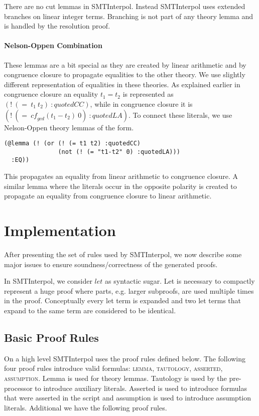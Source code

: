 \documentclass[a4paper]{article}
\newcommand\si{SMTInterpol\xspace}
\newcommand\cf{\mathit{cf}}
\begin{document}
There are no cut lemmas in \si.  Instead \si uses extended branches on
linear integer terms.  Branching is not part of any theory lemma and
is handled by the resolution proof.

\paragraph{Nelson-Oppen Combination}

These lemmas are a bit special as they are created by linear
arithmetic and by congruence closure to propagate equalities to the
other theory.  We use slightly different representation of equalities
in these theories.  As explained earlier in congruence closure an
equality $t_1=t_2$ is represented as $(!\ (=\ t_1\ t_2)\ :quotedCC)$,
while in congruence closure it is
$(!\ (=\ \cf_{gcd}(t_1-t_2)\ 0)\ :quotedLA)$.
To connect these literals, we use Nelson-Oppen theory lemmas of the form.
\begin{verbatim}
(@lemma (! (or (! (= t1 t2) :quotedCC)
               (not (! (= "t1-t2" 0) :quotedLA)))
  :EQ))
\end{verbatim}
This propagates an equality from linear arithmetic to congruence
closure.  A similar lemma where the literals occur in the opposite
polarity is created to propagate an equality from congruence closure
to linear arithmetic.

\section{Implementation}
After presenting the set of rules used by \si, we now describe some
major issues to ensure soundness/correctness of the generated proofs.

In \si, we consider $let$ as syntactic sugar.  Let is necessary to
compactly represent a huge proof where parts, e.g. larger subproofs,
are used multiple times in the proof.  Conceptually every let term is
expanded and two let terms that expand to the same term are considered
to be identical.

\subsection{Basic Proof Rules}

On a high level \si uses the proof rules defined below.
The following four proof rules introduce valid formulas:
\textsc{lemma}, \textsc{tautology}, \textsc{asserted}, \textsc{assumption}.
Lemma is used for theory lemmas.  Tautology is used by the
pre-processor to introduce auxiliary literals.  Asserted is used to
introduce formulas that were asserted in the script and assumption is
used to introduce assumption literals.  Additional we have the
following proof rules.
\end{document}

